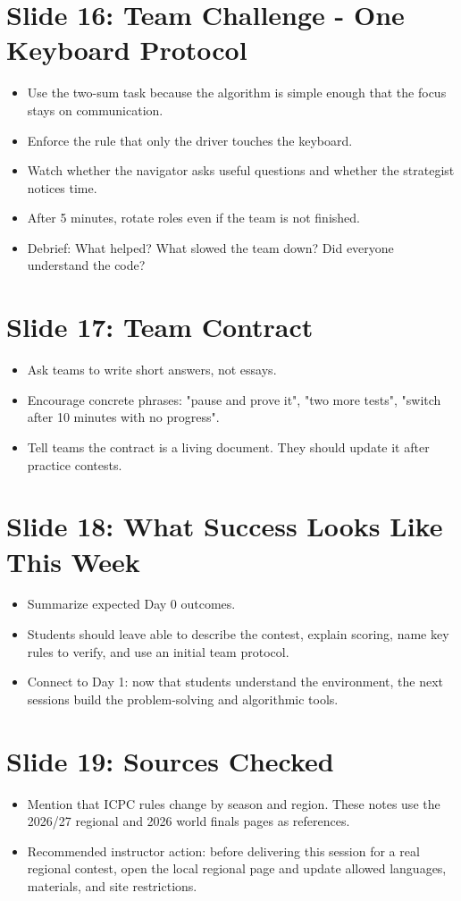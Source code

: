 \documentclass[11pt]{article}
\begin{document}
\section*{Slide 16: Team Challenge - One Keyboard Protocol}
\begin{itemize}
  \item Use the two-sum task because the algorithm is simple enough that the focus stays on communication.
  \item Enforce the rule that only the driver touches the keyboard.
  \item Watch whether the navigator asks useful questions and whether the strategist notices time.
  \item After 5 minutes, rotate roles even if the team is not finished.
  \item Debrief: What helped? What slowed the team down? Did everyone understand the code?
\end{itemize}

\section*{Slide 17: Team Contract}
\begin{itemize}
  \item Ask teams to write short answers, not essays.
  \item Encourage concrete phrases: "pause and prove it", "two more tests", "switch after 10 minutes with no progress".
  \item Tell teams the contract is a living document. They should update it after practice contests.
\end{itemize}

\section*{Slide 18: What Success Looks Like This Week}
\begin{itemize}
  \item Summarize expected Day 0 outcomes.
  \item Students should leave able to describe the contest, explain scoring, name key rules to verify, and use an initial team protocol.
  \item Connect to Day 1: now that students understand the environment, the next sessions build the problem-solving and algorithmic tools.
\end{itemize}

\section*{Slide 19: Sources Checked}
\begin{itemize}
  \item Mention that ICPC rules change by season and region. These notes use the 2026/27 regional and 2026 world finals pages as references.
  \item Recommended instructor action: before delivering this session for a real regional contest, open the local regional page and update allowed languages, materials, and site restrictions.
\end{itemize}
\end{document}
